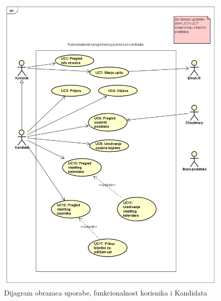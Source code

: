  \begin{figure}[H]
		\includegraphics[width=\textwidth]{slike/UseCase Diagram3.png}
		\centering
		\vspace{-1cm}
		\caption{Dijagram obrazaca uporabe, funkcionalnost korisnika i Kandidata}
		\label{fig:promjene}
	\end{figure}

